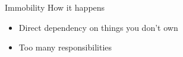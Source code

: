 \documentclass[xcolor=svgnames]{beamer}
\begin{document}


{%
%
\begin{frame}{Immobility}
    How it happens
    \begin{itemize}
        \item<1-> Direct dependency on things you don't own
        \item<2-> Too many responsibilities
    \end{itemize}
\end{frame}
}





{%
%
\begin{frame}{\subsecname}
    \begin{minipage}{\columnwidth}
    \end{minipage}
\end{frame}
}





{%
%
\begin{frame}{\subsecname}
    \begin{minipage}{\columnwidth}
    \end{minipage}
\end{frame}
}
\end{document}
